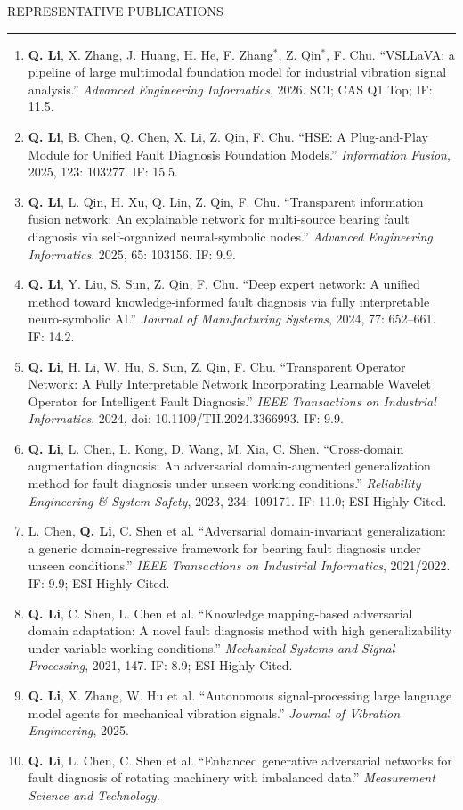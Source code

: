 \documentclass{resume}
\renewenvironment{rSection}[1]{
\sectionskip
\textcolor{TsinghuaPurple}{\MakeUppercase{#1}}
\sectionlineskip
\hrule
\begin{list}{}{\setlength{\leftmargin}{0em}}
\item[]
}{
\end{list}
}
\newcommand{\pubitem}[2]{\item #1 #2}
\begin{document}
\begin{rSection}{Representative Publications}
\begin{enumerate}[leftmargin=1.6em,itemsep=0.18em,topsep=0.15em]
\pubitem{\textbf{Q. Li}, X. Zhang, J. Huang, H. He, F. Zhang$^{*}$, Z. Qin$^{*}$, F. Chu.}{``VSLLaVA: a pipeline of large multimodal foundation model for industrial vibration signal analysis.'' \textit{Advanced Engineering Informatics}, 2026. SCI; CAS Q1 Top; IF: 11.5.}
\pubitem{\textbf{Q. Li}, B. Chen, Q. Chen, X. Li, Z. Qin, F. Chu.}{``HSE: A Plug-and-Play Module for Unified Fault Diagnosis Foundation Models.'' \textit{Information Fusion}, 2025, 123: 103277. IF: 15.5.}
\pubitem{\textbf{Q. Li}, L. Qin, H. Xu, Q. Lin, Z. Qin, F. Chu.}{``Transparent information fusion network: An explainable network for multi-source bearing fault diagnosis via self-organized neural-symbolic nodes.'' \textit{Advanced Engineering Informatics}, 2025, 65: 103156. IF: 9.9.}
\pubitem{\textbf{Q. Li}, Y. Liu, S. Sun, Z. Qin, F. Chu.}{``Deep expert network: A unified method toward knowledge-informed fault diagnosis via fully interpretable neuro-symbolic AI.'' \textit{Journal of Manufacturing Systems}, 2024, 77: 652--661. IF: 14.2.}
\pubitem{\textbf{Q. Li}, H. Li, W. Hu, S. Sun, Z. Qin, F. Chu.}{``Transparent Operator Network: A Fully Interpretable Network Incorporating Learnable Wavelet Operator for Intelligent Fault Diagnosis.'' \textit{IEEE Transactions on Industrial Informatics}, 2024, doi: 10.1109/TII.2024.3366993. IF: 9.9.}
\pubitem{\textbf{Q. Li}, L. Chen, L. Kong, D. Wang, M. Xia, C. Shen.}{``Cross-domain augmentation diagnosis: An adversarial domain-augmented generalization method for fault diagnosis under unseen working conditions.'' \textit{Reliability Engineering \& System Safety}, 2023, 234: 109171. IF: 11.0; ESI Highly Cited.}
\pubitem{L. Chen, \textbf{Q. Li}, C. Shen et al.}{``Adversarial domain-invariant generalization: a generic domain-regressive framework for bearing fault diagnosis under unseen conditions.'' \textit{IEEE Transactions on Industrial Informatics}, 2021/2022. IF: 9.9; ESI Highly Cited.}
\pubitem{\textbf{Q. Li}, C. Shen, L. Chen et al.}{``Knowledge mapping-based adversarial domain adaptation: A novel fault diagnosis method with high generalizability under variable working conditions.'' \textit{Mechanical Systems and Signal Processing}, 2021, 147. IF: 8.9; ESI Highly Cited.}
\pubitem{\textbf{Q. Li}, X. Zhang, W. Hu et al.}{``Autonomous signal-processing large language model agents for mechanical vibration signals.'' \textit{Journal of Vibration Engineering}, 2025.}
\pubitem{\textbf{Q. Li}, L. Chen, C. Shen et al.}{``Enhanced generative adversarial networks for fault diagnosis of rotating machinery with imbalanced data.'' \textit{Measurement Science and Technology}.}
\end{enumerate}
\end{rSection}
\end{document}

